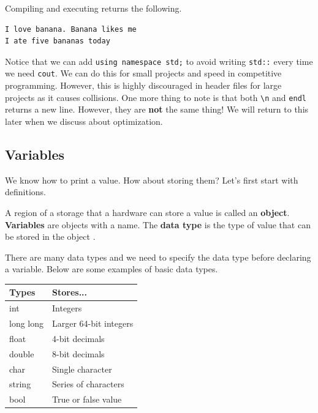 \documentclass[../../main.tex]{subfiles}
\begin{document}
Compiling and executing returns the following.

\begin{outputbox}
\begin{lstlisting}[style=basic]
I love banana. Banana likes me
I ate five bananas today
\end{lstlisting}
\end{outputbox}

Notice that we can add \verb|using namespace std;| to avoid writing
\verb|std::| every time we need \verb|cout|. We can do this for
small projects and speed in competitive programming. However, this
is highly discouraged in header files for large projects as it causes
collisions. One more thing to note is that both \verb|\n| and
\verb|endl| returns a new line. However, they are \textbf{not} the
same thing! We will return to this later when we discuss about
optimization.

\subsection{Variables}

We know how to print a value. How about storing them? Let's first
start with definitions.

\begin{definition}{}{}
A region of a storage that a hardware can store a value is called an
\textbf{object}. \textbf{Variables} are objects with a name.
The \textbf{data type} is the type of value that can be stored in the
object \cite{CS02-1}.
\end{definition}

There are many data types and we need to specify the data type
before declaring a variable. Below are some examples of basic
data types.

\begin{center}
\begin{tabular}{|p{}|p{}|}
    \hline
    \textbf{Types} & \textbf{Stores...} \\
    \hline
    int            & Integers \\
    \hline
    long long      & Larger 64-bit integers \\
    \hline
    float          & 4-bit decimals \\
    \hline
    double         & 8-bit decimals \\
    \hline
    char           & Single character \\
    \hline
    string         & Series of characters \\
    \hline
    bool           & True or false value \\
    \hline
\end{tabular}
\end{center}
\end{document}
